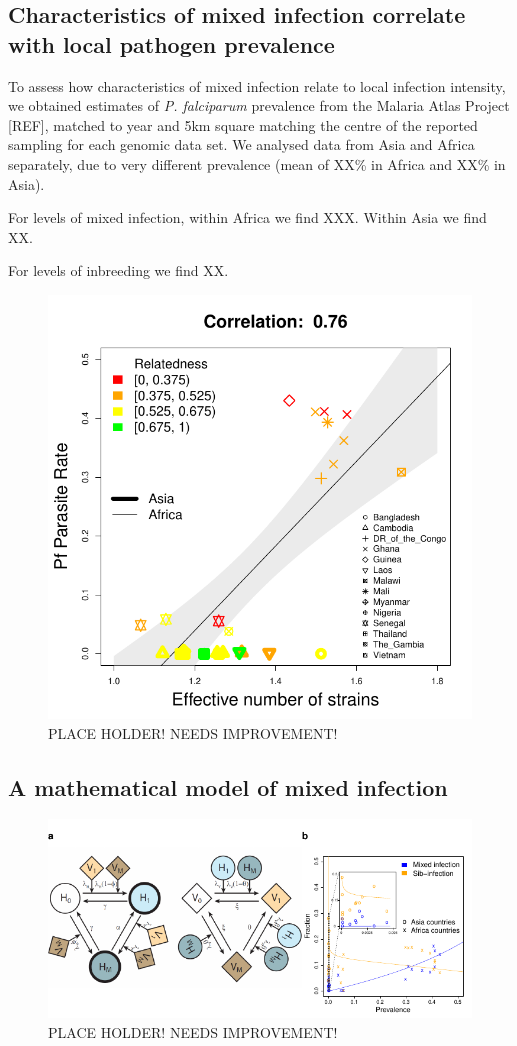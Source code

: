 \documentclass[9pt,lineno]{elife}
\begin{document}
\subsection{Characteristics of mixed infection correlate with local pathogen prevalence}

To assess how characteristics of mixed infection relate to local infection intensity, we obtained estimates of {\it P. falciparum} prevalence from the Malaria Atlas Project [REF], matched to year and 5km square matching the centre of the reported sampling for each genomic data set.  We analysed data from Asia and Africa separately, due to very different prevalence (mean of XX\% in Africa and XX\% in Asia).

For levels of mixed infection, within Africa we find XXX.  Within Asia we find XX.

For levels of inbreeding we find XX.


\begin{figure}[ht]
  \centering{}
    \includegraphics[width=.5\textwidth]{Fig4.pdf}
  \caption{PLACE HOLDER! NEEDS IMPROVEMENT!}
\end{figure}

\subsection{A mathematical model of mixed infection}

\begin{figure}[ht]
  \centering{}
  \includegraphics[width=\textwidth]{Fig5.pdf}
  \caption{PLACE HOLDER! NEEDS IMPROVEMENT!}
\end{figure}
\end{document}
